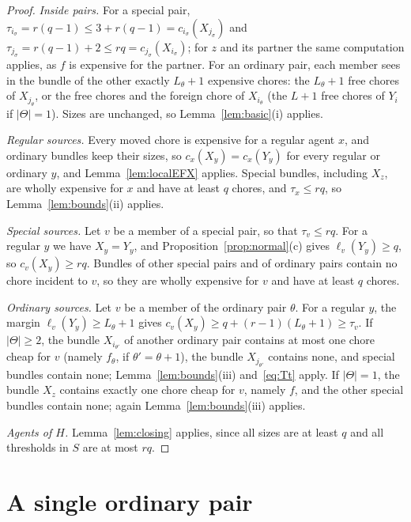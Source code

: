 \documentclass{amsart}
\numberwithin{equation}{section}
\theoremstyle{definition}
\theoremstyle{remark}
\begin{document}
\begin{proof}
\emph{Inside pairs.} For a special pair, $\tau_{i_\sigma}=r(q-1)\le 3+r(q-1)=c_{i_\sigma}(X_{j_\sigma})$ and $\tau_{j_\sigma}=r(q-1)+2\le rq=c_{j_\sigma}(X_{i_\sigma})$; for $z$ and its partner the same computation applies, as $f$ is expensive for the partner. For an ordinary pair, each member sees in the bundle of the other exactly $L_\theta+1$ expensive chores: the $L_\theta+1$ free chores of $X_{j_\theta}$, or the free chores and the foreign chore of $X_{i_\theta}$ (the $L+1$ free chores of $Y_i$ if $|\Theta|=1$). Sizes are unchanged, so Lemma~\ref{lem:basic}(i) applies.

\emph{Regular sources.} Every moved chore is expensive for a regular agent $x$, and ordinary bundles keep their sizes, so $c_x(X_y)=c_x(Y_y)$ for every regular or ordinary $y$, and Lemma~\ref{lem:localEFX} applies. Special bundles, including $X_z$, are wholly expensive for $x$ and have at least $q$ chores, and $\tau_x\le rq$, so Lemma~\ref{lem:bounds}(ii) applies.

\emph{Special sources.} Let $v$ be a member of a special pair, so that $\tau_v\le rq$. For a regular $y$ we have $X_y=Y_y$, and Proposition~\ref{prop:normal}(c) gives $\ell_v(Y_y)\ge q$, so $c_v(X_y)\ge rq$. Bundles of other special pairs and of ordinary pairs contain no chore incident to $v$, so they are wholly expensive for $v$ and have at least $q$ chores.

\emph{Ordinary sources.} Let $v$ be a member of the ordinary pair $\theta$. For a regular $y$, the margin $\ell_v(Y_y)\ge L_\theta+1$ gives $c_v(X_y)\ge q+(r-1)(L_\theta+1)\ge\tau_v$. If $|\Theta|\ge2$, the bundle $X_{i_{\theta'}}$ of another ordinary pair contains at most one chore cheap for $v$ (namely $f_\theta$, if $\theta'=\theta+1$), the bundle $X_{j_{\theta'}}$ contains none, and special bundles contain none; Lemma~\ref{lem:bounds}(iii) and~\eqref{eq:Tt} apply. If $|\Theta|=1$, the bundle $X_z$ contains exactly one chore cheap for $v$, namely $f$, and the other special bundles contain none; again Lemma~\ref{lem:bounds}(iii) applies.

\emph{Agents of $H$.} Lemma~\ref{lem:closing} applies, since all sizes are at least $q$ and all thresholds in $S$ are at most $rq$.
\end{proof}

\section{A single ordinary pair}\label{sec:onepair}
\end{document}
